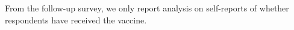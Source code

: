 \documentclass[letterpaper, 12pt, parskip=full,DIV=10]{scrartcl}
\begin{document}
From the follow-up survey, we only report analysis on self-reports of whether respondents have received the vaccine. 

\clearpage




\clearpage

%
\end{document}
